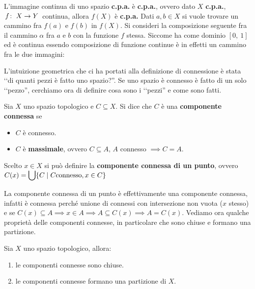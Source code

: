 \begin{observe}
	L'immagine continua di uno spazio \textbf{c.p.a.} è \textbf{c.p.a.}, ovvero dato $X$ \textbf{c.p.a.}, $\funz f X Y$ continua, allora $f(X)$ è \textbf{c.p.a.}\newline
	Dati $a,b\in X$ si vuole trovare un cammino fra $f(a)$ e $f(b)$ in $f(X)$. Si consideri la composizione seguente fra il cammino $\alpha$ fra $a$ e $b$ con la funzione $f$ stessa. Siccome ha come dominio $\left[0,\ 1\right]$ ed è continua essendo composizione di funzione continue è in effetti un cammino fra le due immagini:
\begin{center}
\end{center}
\end{observe}
L'intuizione geometrica che ci ha portati alla definizione di connessione è stata ‘‘di quanti pezzi è fatto uno spazio?''. Se uno spazio è connesso è fatto di un solo ‘‘pezzo'', cerchiamo ora di definire cosa sono i ‘‘pezzi'' e come sono fatti.
\begin{define}
	Sia $X$ uno spazio topologico e $C\subseteq X$. Si dice che $C$ è una \textbf{componente connessa} se 
		\begin{itemize}
			\item $C$ è connesso.
			\item $C$ è \textbf{massimale}, ovvero $C\subseteq A$, $A$ connesso $\implies C=A$.
		\end{itemize}
	Scelto $x\in X$ si può definire la \textbf{componente connessa di un punto}, ovvero $\displaystyle C(x)=\mathop{{\bigcup}}\displaylimits \{C \mid C\text{connesso}, x\in C\}$
\end{define}
La componente connessa di un punto è effettivamente una componente connessa, infatti è connessa perché unione di connessi con intersezione non vuota ($x$ stesso) e se $C(x)\subseteq A \implies x\in A \implies A\subseteq C(x) \implies A=C(x)$.\newline
Vediamo ora qualche proprietà delle componenti connesse, in particolare che sono chiuse e formano una partizione.
\begin{theorema}
	Sia $X$ uno spazio topologico, allora:
		\begin{enumerate}
			\item le componenti connesse sono chiuse.
			\item le componenti connesse formano una partizione di $X$.
		\end{enumerate}
\end{theorema}

